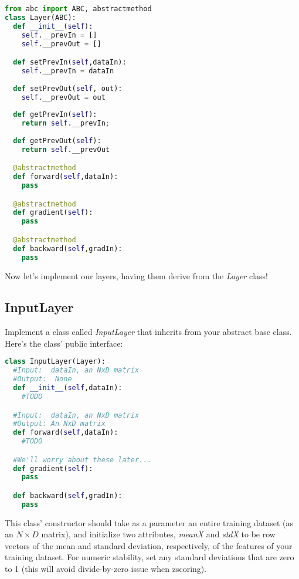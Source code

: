 \documentclass[12pt]{article}
\begin{document}
\begin{lstlisting}[language=Python]
from abc import ABC, abstractmethod
class Layer(ABC):
  def __init__(self):
    self.__prevIn = []
    self.__prevOut = []

  def setPrevIn(self,dataIn):
    self.__prevIn = dataIn
  
  def setPrevOut(self, out):
    self.__prevOut = out
  
  def getPrevIn(self):
    return self.__prevIn;
  
  def getPrevOut(self):
    return self.__prevOut

  @abstractmethod
  def forward(self,dataIn):
    pass

  @abstractmethod
  def gradient(self):
    pass

  @abstractmethod
  def backward(self,gradIn):
    pass  
\end{lstlisting}

\noindent
Now let's implement our layers, having them derive from the \emph{Layer} class!

\newpage

\subsection*{InputLayer}
Implement a class called \emph{InputLayer} that inherits from your abstract base class.  Here's the class' public interface:
\begin{lstlisting}[language=Python]
class InputLayer(Layer):
  #Input:  dataIn, an NxD matrix
  #Output:  None
  def __init__(self,dataIn):
    #TODO  

  #Input:  dataIn, an NxD matrix
  #Output: An NxD matrix
  def forward(self,dataIn):
    #TODO

  #We'll worry about these later...
  def gradient(self):
    pass

  def backward(self,gradIn):
    pass

\end{lstlisting}

\noindent
This class' constructor should take as a parameter an entire training dataset (as an $N\times D$ matrix), and initialize two attributes, \emph{meanX} and \emph{stdX} to be row vectors of the mean and standard deviation, respectively, of the features of your training dataset. For numeric stability, set any standard deviations that are zero to 1 (this will avoid divide-by-zero issue when zscoring).\\
\end{document}
